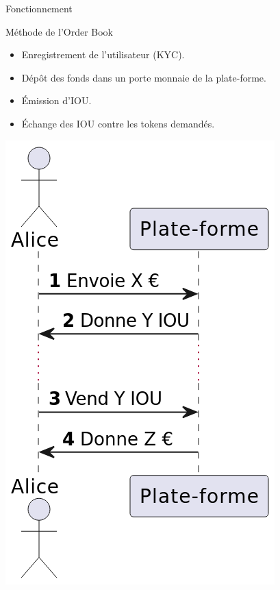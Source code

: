 \begin{frame}{Fonctionnement}    
    \begin{block}{Méthode de l'Order Book}
        \begin{itemize}
            \item Enregistrement de l'utilisateur (KYC).
            \item Dépôt des fonds dans un porte monnaie de la plate-forme. 
            \item Émission d'IOU\footnotemark.
            \item Échange des IOU contre les tokens demandés.
        \end{itemize}
    \end{block}
        \centering
        \includegraphics[scale = 0.25]{centralisation/img_plateformes/Achat-Vente.png}
\end{frame}

